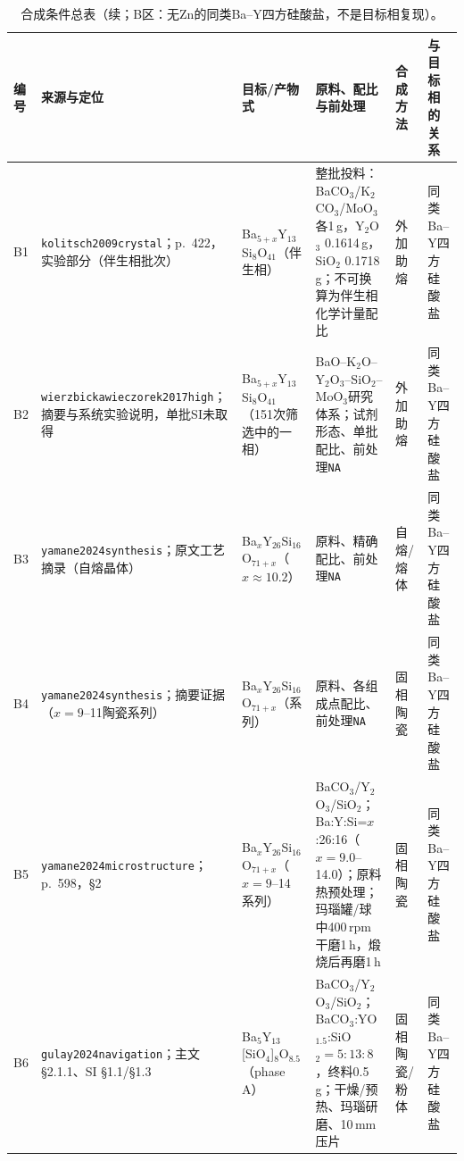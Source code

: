 \begin{table}[p]
\ContinuedFloat
\centering
\footnotesize
\renewcommand{\arraystretch}{0.80}
\setlength{\tabcolsep}{1.5pt}
\caption{合成条件总表（续；B区：无Zn的同类Ba--Y四方硅酸盐，不是目标相复现）。}
\begin{tabular}{P{0.045\textwidth}P{0.19\textwidth}P{0.16\textwidth}P{0.27\textwidth}P{0.13\textwidth}P{0.10\textwidth}}
\toprule
编号 & 来源与定位 & 目标/产物式 & 原料、配比与前处理 & 合成方法 & 与目标相的关系\\
\midrule
B1 & \texttt{kolitsch2009crystal}；p.~422，实验部分（伴生相批次）\cite{kolitsch2009crystal} & Ba$_{5+x}$Y$_{13}$Si$_8$O$_{41}$（伴生相） & 整批投料：BaCO$_3$/K$_2$CO$_3$/MoO$_3$各1\,g，Y$_2$O$_3$ 0.1614\,g，SiO$_2$ 0.1718\,g；不可换算为伴生相化学计量配比 & 外加助熔 & 同类Ba--Y四方硅酸盐\\
B2 & \texttt{wierzbickawieczorek2017high}；摘要与系统实验说明，单批SI未取得\cite{wierzbickawieczorek2017high} & Ba$_{5+x}$Y$_{13}$Si$_8$O$_{41}$（151次筛选中的一相） & BaO--K$_2$O--Y$_2$O$_3$--SiO$_2$--MoO$_3$研究体系；试剂形态、单批配比、前处理\texttt{NA} & 外加助熔 & 同类Ba--Y四方硅酸盐\\
B3 & \texttt{yamane2024synthesis}；原文工艺摘录（自熔晶体）\cite{yamane2024synthesis} & Ba$_x$Y$_{26}$Si$_{16}$O$_{71+x}$（$x\approx10.2$） & 原料、精确配比、前处理\texttt{NA} & 自熔/熔体 & 同类Ba--Y四方硅酸盐\\
B4 & \texttt{yamane2024synthesis}；摘要证据（$x=9$--11陶瓷系列）\cite{yamane2024synthesis} & Ba$_x$Y$_{26}$Si$_{16}$O$_{71+x}$（系列） & 原料、各组成点配比、前处理\texttt{NA} & 固相陶瓷 & 同类Ba--Y四方硅酸盐\\
B5 & \texttt{yamane2024microstructure}；p.~598，\S2\cite{yamane2024microstructure} & Ba$_x$Y$_{26}$Si$_{16}$O$_{71+x}$（$x=9$--14系列） & BaCO$_3$/Y$_2$O$_3$/SiO$_2$；Ba:Y:Si=$x$:26:16（$x=9.0$--14.0）；原料热预处理；玛瑙罐/球中400\,rpm干磨1\,h，煅烧后再磨1\,h & 固相陶瓷 & 同类Ba--Y四方硅酸盐\\
B6 & \texttt{gulay2024navigation}；主文\S2.1.1、SI \S1.1/\S1.3\cite{gulay2024navigation} & Ba$_5$Y$_{13}$[SiO$_4$]$_8$O$_{8.5}$（phase A） & BaCO$_3$/Y$_2$O$_3$/SiO$_2$；BaCO$_3$:YO$_{1.5}$:SiO$_2=5{:}13{:}8$，终料0.5\,g；干燥/预热、玛瑙研磨、10\,mm压片 & 固相陶瓷/粉体 & 同类Ba--Y四方硅酸盐\\
\bottomrule
\end{tabular}


\end{table}
